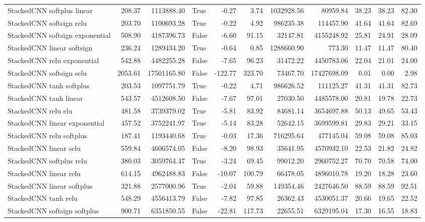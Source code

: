 \begin{tabular}{lrrlrrrrrrr}
StackedCNN softplus linear & 208.37 & 1113888.40 & True & -0.27 & 3.74 & 1032928.56 & 80959.84 & 38.23 & 38.23 & 82.30 \\
StackedCNN softsign relu & 203.70 & 1100693.28 & True & -0.22 & 4.92 & 986235.38 & 114457.90 & 41.64 & 41.64 & 82.69 \\
StackedCNN softsign exponential & 508.90 & 4187396.73 & False & -6.60 & 91.15 & 32147.81 & 4155248.92 & 25.81 & 24.91 & 28.09 \\
StackedCNN linear softsign & 236.24 & 1289434.20 & True & -0.64 & 0.85 & 1288660.90 & 773.30 & 11.47 & 11.47 & 80.40 \\
StackedCNN relu exponential & 542.88 & 4482255.28 & False & -7.65 & 96.23 & 31472.22 & 4450783.06 & 22.04 & 21.01 & 24.00 \\
StackedCNN softsign selu & 2053.61 & 17501165.80 & False & -122.77 & 323.70 & 73467.70 & 17427698.09 & 0.01 & 0.00 & 2.98 \\
StackedCNN tanh softplus & 203.53 & 1097751.79 & True & -0.22 & 4.71 & 986626.52 & 111125.27 & 41.31 & 41.31 & 82.73 \\
StackedCNN tanh linear & 543.57 & 4512608.50 & False & -7.67 & 97.01 & 27030.50 & 4485578.00 & 20.81 & 19.78 & 22.73 \\
StackedCNN relu elu & 481.58 & 3739379.02 & True & -5.81 & 83.92 & 84681.14 & 3654697.88 & 50.13 & 49.65 & 53.43 \\
StackedCNN linear exponential & 457.52 & 3752241.97 & True & -5.14 & 83.28 & 52642.15 & 3699599.81 & 29.83 & 29.21 & 33.15 \\
StackedCNN relu softplus & 187.41 & 1193440.68 & True & -0.03 & 17.36 & 716295.64 & 477145.04 & 59.08 & 59.08 & 85.03 \\
StackedCNN linear selu & 559.84 & 4606574.05 & False & -8.20 & 98.93 & 35641.95 & 4570932.10 & 22.53 & 21.82 & 24.82 \\
StackedCNN softplus relu & 380.03 & 3059764.47 & True & -3.24 & 69.45 & 99012.20 & 2960752.27 & 70.70 & 70.58 & 74.00 \\
StackedCNN linear relu & 614.15 & 4962488.83 & False & -10.07 & 100.79 & 66478.05 & 4896010.78 & 19.20 & 18.28 & 23.60 \\
StackedCNN linear softplus & 321.88 & 2577000.96 & True & -2.04 & 59.88 & 149354.46 & 2427646.50 & 88.59 & 88.59 & 92.51 \\
StackedCNN tanh relu & 548.29 & 4556413.79 & False & -7.82 & 97.85 & 26362.43 & 4530051.37 & 20.66 & 19.65 & 22.52 \\
StackedCNN softsign softplus & 900.71 & 6351850.55 & False & -22.81 & 117.73 & 22655.51 & 6329195.04 & 17.30 & 16.55 & 18.83 \\

\end{tabular}

